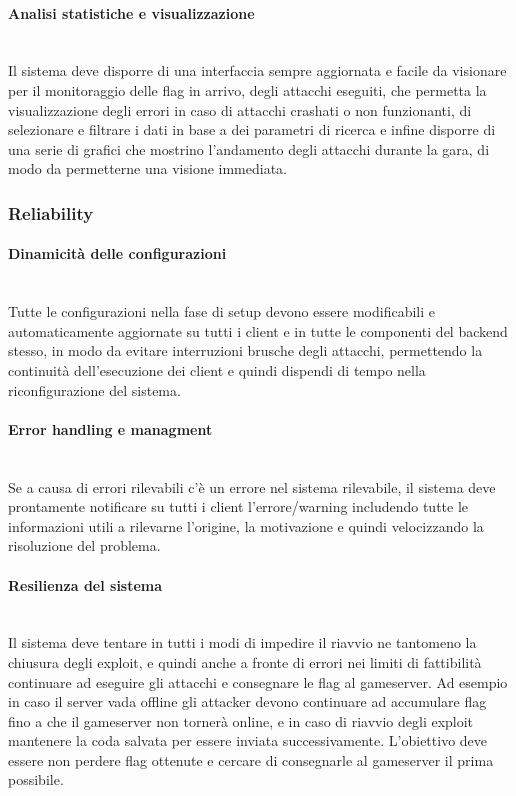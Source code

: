 \documentclass[11pt]{article}
\begin{document}
\paragraph{Analisi statistiche e visualizzazione}\mbox{}\\
Il sistema deve disporre di una interfaccia sempre aggiornata e facile da visionare per il monitoraggio delle flag in arrivo, degli attacchi eseguiti, che permetta la visualizzazione degli errori in caso di attacchi crashati o non funzionanti, di selezionare e filtrare i dati in base a dei parametri di ricerca e infine disporre di una serie di grafici che mostrino l'andamento degli attacchi durante la gara, di modo da permetterne una visione immediata.
\subsubsection{Reliability}
\paragraph{Dinamicità delle configurazioni}\mbox{}\\
Tutte le configurazioni nella fase di setup devono essere modificabili e automaticamente aggiornate su tutti i client e in tutte le componenti del backend stesso, in modo da evitare interruzioni brusche degli attacchi, permettendo la continuità dell'esecuzione dei client e quindi dispendi di tempo nella riconfigurazione del sistema.
\paragraph{Error handling e managment}\mbox{}\\
Se a causa di errori rilevabili c'è un errore nel sistema rilevabile, il sistema deve prontamente notificare su tutti i client l'errore/warning includendo tutte le informazioni utili a rilevarne l'origine, la motivazione  e quindi velocizzando la risoluzione del problema.
\paragraph{Resilienza del sistema}\mbox{}\\
Il sistema deve tentare in tutti i modi di impedire il riavvio ne tantomeno la chiusura degli exploit, e quindi anche a fronte di errori nei limiti di fattibilità continuare ad eseguire gli attacchi e consegnare le flag al gameserver. Ad esempio in caso il server vada offline gli attacker devono continuare ad accumulare flag fino a che il gameserver non tornerà online, e in caso di riavvio degli exploit mantenere la coda salvata per essere inviata successivamente. L'obiettivo deve essere non perdere flag ottenute e cercare di consegnarle al gameserver il prima possibile.
\end{document}
